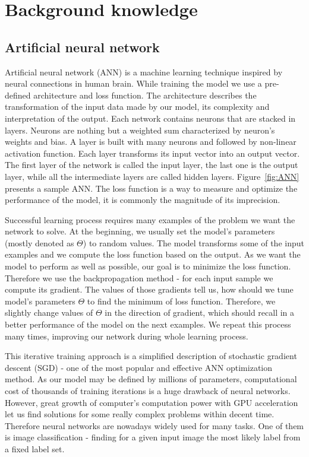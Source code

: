 \documentclass{article}
\begin{document}
\section{Background knowledge}
\subsection{Artificial neural network}

Artificial neural network (ANN) is a machine learning technique inspired by neural connections in human brain. While training the model we use a pre-defined architecture and loss function. The architecture describes the transformation of the input data made by our model, its complexity and interpretation of the output. Each network contains neurons that are stacked in layers. Neurons are nothing but a weighted sum characterized by neuron's weights and bias. A layer is built with many neurons and followed by non-linear activation function. Each layer transforms its input vector into an output vector. The first layer of the network is called the input layer, the last one is the output layer, while all the intermediate layers are called hidden layers. Figure~\ref{fig:ANN} presents a sample ANN. The loss function is a way to measure and optimize the performance of the model, it is commonly the magnitude of its imprecision.
\par
Successful learning process requires many examples of the problem we want the network to solve. At the beginning, we usually set the model's parameters (mostly denoted as $\Theta$) to random values. The model transforms some of the input examples and we compute the loss function based on the output. As we want the model to perform as well as possible, our goal is to minimize the loss function. Therefore we use the backpropagation method - for each input sample we compute its gradient. The values of those gradients tell us, how should we tune model's parameters $\Theta$ to find the minimum of loss function. Therefore, we slightly change values of $\Theta$ in the direction of gradient, which should recall in a better performance of the model on the next examples. We repeat this process many times, improving our network during whole learning process. 
\par
This iterative training approach is a simplified description of stochastic gradient descent (SGD) - one of the most popular and effective ANN optimization method. As our model may be defined by millions of parameters, computational cost of thousands of training iterations is a huge drawback of neural networks. However, great growth of computer's computation power with GPU acceleration let us find solutions for some really complex problems within decent time.  Therefore neural networks are nowadays widely used for many tasks. One of them is image classification - finding for a given input image the most likely label from a fixed label set.
\end{document}
